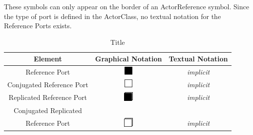 These symbols can only appear on the border of an ActorReference symbol. Since the type of port is defined 
in the ActorClass, no textual notation for the Reference Ports exists.

\begin{table}
\caption{Title}
\begin{tabular}{|c|c|c|}
\hline
 \textbf{Element} & \textbf{Graphical Notation} & \textbf{Textual Notation} \\ \hline
 Reference Port & \includegraphics{images/040-ReferencePort.png} & \textit{implicit} \\ \hline
 Conjugated Reference Port & \includegraphics{images/040-ConjugatedReferencePort.png} & \textit{implicit} 
\\ \hline
 Replicated Reference Port & \includegraphics{images/040-ReplicatedReferencePort.png} & \textit{implicit} 
\\ \hline
 Conjugated Replicated \\ Reference Port & 
\includegraphics{images/040-ConjugatedReplicatedReferencePort.png} & \textit{implicit} \\ \hline
\end{tabular}
\end{table}



